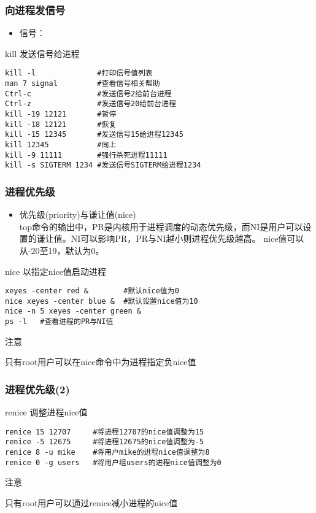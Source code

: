 \documentclass[xcolor=svgnames,presentation]{beamer}
\begin{document}
\begin{frame}[fragile]
\frametitle{向进程发信号}
\label{sec-3-1-5}
\begin{itemize}

\item 信号：
\label{sec-3-1-5-1}%
\end{itemize} %
\begin{exampleblock}{kill 发送信号给进程}
\label{sec-3-1-5-2}


\begin{verbatim}
kill -l              #打印信号值列表
man 7 signal         #查看信号相关帮助
Ctrl-c               #发送信号2给前台进程
Ctrl-z               #发送信号20给前台进程
kill -19 12121       #暂停
kill -18 12121       #恢复
kill -15 12345       #发送信号15给进程12345
kill 12345           #同上
kill -9 11111        #强行杀死进程11111
kill -s SIGTERM 1234 #发送信号SIGTERM给进程1234
\end{verbatim}
\end{exampleblock}
\end{frame}
\begin{frame}[fragile]
\frametitle{进程优先级}
\label{sec-3-1-6}
\begin{itemize}

\item 优先级(priority)与谦让值(nice)\\
\label{sec-3-1-6-1}%
top命令的输出中，PR是内核用于进程调度的动态优先级，而NI是用户可以设置的谦让值。NI可以影响PR，PR与NI越小则进程优先级越高。
nice值可以从-20至19，默认为0。
\end{itemize} %
\begin{exampleblock}{nice  以指定nice值启动进程}
\label{sec-3-1-6-2}


\begin{verbatim}
xeyes -center red &        #默认nice值为0
nice xeyes -center blue &  #默认设置nice值为10
nice -n 5 xeyes -center green &
ps -l   #查看进程的PR与NI值
\end{verbatim}
\end{exampleblock}
\begin{block}{注意}
\label{sec-3-1-6-3}

只有root用户可以在nice命令中为进程指定负nice值
\end{block}
\end{frame}
\begin{frame}[fragile]
\frametitle{进程优先级(2)}
\label{sec-3-1-7}
\begin{exampleblock}{renice  调整进程nice值}
\label{sec-3-1-7-1}


\begin{verbatim}
renice 15 12707     #将进程12707的nice值调整为15
renice -5 12675     #将进程12675的nice值调整为-5
renice 8 -u mike    #将用户mike的进程nice值调整为8
renice 0 -g users   #将用户组users的进程nice值调整为0
\end{verbatim}
\end{exampleblock}
\begin{block}{注意}
\label{sec-3-1-7-2}

只有root用户可以通过renice减小进程的nice值
\end{block}
\end{frame}
\end{document}
